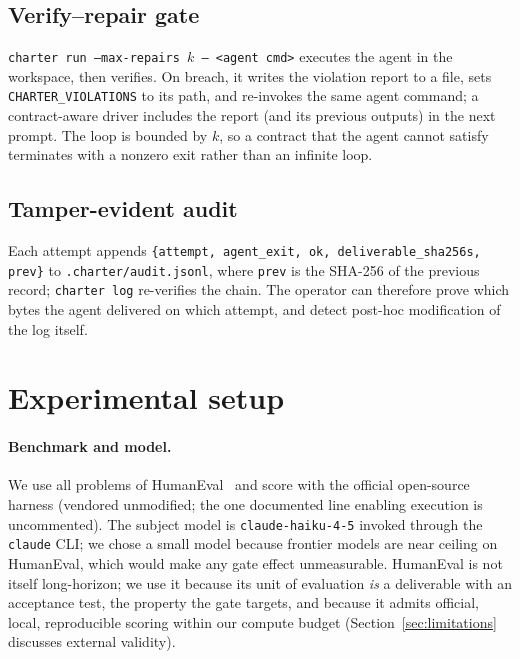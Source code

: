 \documentclass{article}
\begin{document}
\subsection{Verify--repair gate}
\texttt{charter run --max-repairs $k$ -- <agent cmd>} executes the agent in the
workspace, then verifies. On breach, it writes the violation report to a file, sets
\texttt{CHARTER\_VIOLATIONS} to its path, and re-invokes the same agent command; a
contract-aware driver includes the report (and its previous outputs) in the next
prompt. The loop is bounded by $k$, so a contract that the agent cannot satisfy
terminates with a nonzero exit rather than an infinite loop.

\subsection{Tamper-evident audit}
Each attempt appends \texttt{\{attempt, agent\_exit, ok, deliverable\_sha256s, prev\}}
to \texttt{.charter/audit.jsonl}, where \texttt{prev} is the SHA-256 of the previous
record; \texttt{charter log} re-verifies the chain. The operator can therefore prove
which bytes the agent delivered on which attempt, and detect post-hoc modification of
the log itself.

\section{Experimental setup}

\paragraph{Benchmark and model.} We use all \numntasks{} problems of
HumanEval~\cite{chen2021humaneval} and score with the official open-source harness
(vendored unmodified; the one documented line enabling execution is uncommented).
The subject model is \texttt{claude-haiku-4-5} invoked through the \texttt{claude}
CLI; we chose a small model because frontier models are near ceiling on HumanEval,
which would make any gate effect unmeasurable. HumanEval is not itself long-horizon;
we use it because its unit of evaluation \emph{is} a deliverable with an acceptance
test, the property the gate targets, and because it admits official, local,
reproducible scoring within our compute budget (Section~\ref{sec:limitations}
discusses external validity).
\end{document}
